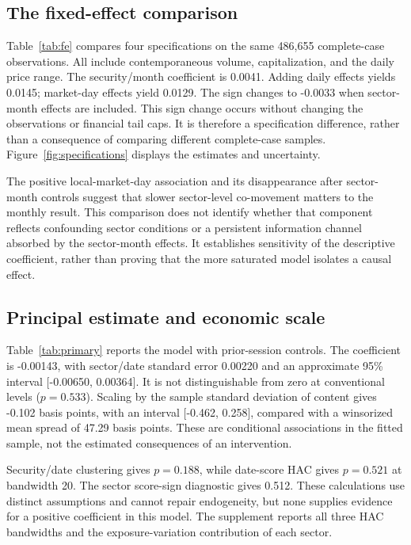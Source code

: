 \subsection{The fixed-effect comparison}
Table~\ref{tab:fe} compares four specifications on the same 486,655 complete-case observations. All include contemporaneous volume, capitalization, and the daily price range. The security/month coefficient is 0.0041. Adding daily effects yields 0.0145; market-day effects yield 0.0129. The sign changes to -0.0033 when sector-month effects are included. This sign change occurs without changing the observations or financial tail caps. It is therefore a specification difference, rather than a consequence of comparing different complete-case samples. Figure~\ref{fig:specifications} displays the estimates and uncertainty.

The positive local-market-day association and its disappearance after sector-month controls suggest that slower sector-level co-movement matters to the monthly result. This comparison does not identify whether that component reflects confounding sector conditions or a persistent information channel absorbed by the sector-month effects. It establishes sensitivity of the descriptive coefficient, rather than proving that the more saturated model isolates a causal effect.

\subsection{Principal estimate and economic scale}
Table~\ref{tab:primary} reports the model with prior-session controls. The coefficient is -0.00143, with sector/date standard error 0.00220 and an approximate 95\% interval [-0.00650, 0.00364]. It is not distinguishable from zero at conventional levels ($p=0.533$). Scaling by the sample standard deviation of content gives -0.102 basis points, with an interval [-0.462, 0.258], compared with a winsorized mean spread of 47.29 basis points. These are conditional associations in the fitted sample, not the estimated consequences of an intervention.

Security/date clustering gives $p=0.188$, while date-score HAC gives $p=0.521$ at bandwidth 20. The sector score-sign diagnostic gives 0.512. These calculations use distinct assumptions and cannot repair endogeneity, but none supplies evidence for a positive coefficient in this model. The supplement reports all three HAC bandwidths and the exposure-variation contribution of each sector.

